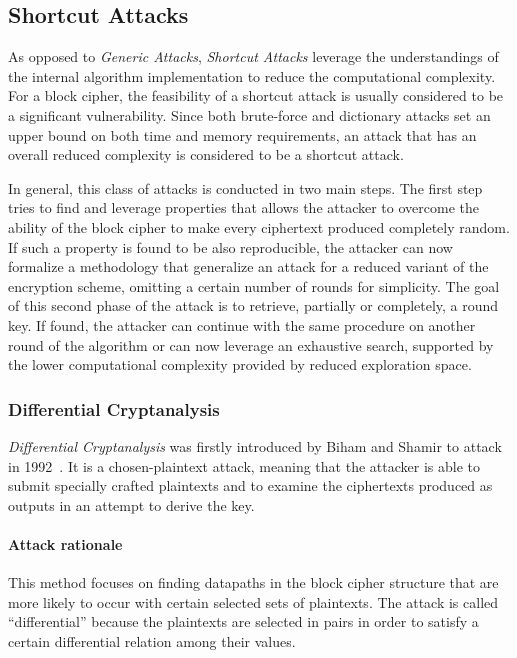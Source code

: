     \subsection{Shortcut Attacks}\label{subsec:shortcut_att}
        As opposed to \emph{Generic Attacks}, \emph{Shortcut Attacks} leverage the understandings of the internal algorithm implementation to reduce the computational complexity. For a block cipher, the feasibility of a shortcut attack is usually considered to be a significant vulnerability. Since both brute-force and dictionary attacks set an upper bound on both time and memory requirements, an attack that has an overall reduced complexity is considered to be a shortcut attack.
        
        In general, this class of attacks is conducted in two main steps. The first step tries to find and leverage properties that allows the attacker to overcome the ability of the block cipher to make every ciphertext produced completely random. If such a property is found to be also reproducible, the attacker can now formalize a methodology that generalize an attack for a reduced variant of the encryption scheme, omitting a certain number of rounds for simplicity. The goal of this second phase of the attack is to retrieve, partially or completely, a round key. If found, the attacker can continue with the same procedure on another round of the algorithm or can now leverage an exhaustive search, supported by the lower computational complexity provided by reduced exploration space.

        \subsubsection{Differential Cryptanalysis}\label{subsub:diff_crypt}
            \emph{Differential Cryptanalysis} was firstly introduced by Biham and Shamir to attack \des{} in 1992~\cite{biham1992differential}. It is a chosen-plaintext attack, meaning that the attacker is able to submit specially crafted plaintexts and to examine the ciphertexts produced as outputs in an attempt to derive the key.

            \paragraph{Attack rationale}

                This method focuses on finding datapaths in the block cipher structure that are more likely to occur with certain selected sets of plaintexts. The attack is called ``differential'' because the plaintexts are selected in pairs in order to satisfy a certain differential relation among their values.

